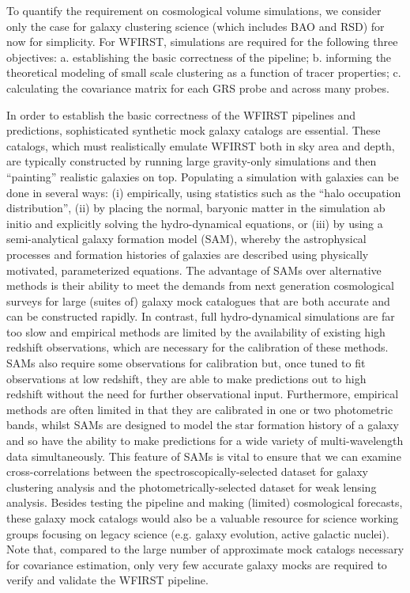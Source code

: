  To quantify the requirement on cosmological volume simulations, we consider only
 the case for galaxy clustering science (which includes BAO and RSD) for now for
 simplicity. For WFIRST, simulations are required for the following three
 objectives:  a. establishing the basic correctness of the pipeline; b.
 informing the theoretical modeling of small scale clustering as a function of
 tracer properties; c.	calculating the covariance matrix for each GRS probe and
 across many probes.

 In order to establish the basic correctness of the WFIRST pipelines and
 predictions, sophisticated synthetic mock galaxy catalogs are essential.
 These catalogs, which must realistically emulate WFIRST both in sky area and
 depth, are typically constructed by running large gravity-only simulations and
 then ``painting'' realistic galaxies on top.  Populating a simulation with
 galaxies can be done in several ways: (i) empirically, using statistics such as
 the ``halo occupation distribution'', (ii) by placing the normal, baryonic matter
 in the simulation ab initio and explicitly solving the hydro-dynamical
 equations, or (iii) by using a semi-analytical galaxy formation model (SAM),
 whereby the astrophysical processes and formation histories of galaxies are
 described using physically motivated, parameterized equations. The advantage of
 SAMs over alternative methods is their ability to meet the demands from next
 generation cosmological surveys for large (suites of) galaxy mock catalogues
 that are both accurate and can be constructed rapidly. In contrast, full
 hydro-dynamical simulations are far too slow and empirical methods are limited
 by the availability of existing high redshift observations, which are necessary
 for the calibration of these methods. SAMs also require some observations for
 calibration but, once tuned to fit observations at low redshift, they are able
 to make predictions out to high redshift without the need for further
 observational input. Furthermore, empirical methods are often limited in that
 they are calibrated in one or two photometric bands, whilst SAMs are designed to
 model the star formation history of a galaxy and so have the ability to make
 predictions for a wide variety of multi-wavelength data simultaneously. This
 feature of SAMs is vital to ensure that we can examine cross-correlations
 between the spectroscopically-selected dataset for galaxy clustering analysis
 and the photometrically-selected dataset for weak lensing analysis. Besides
 testing the pipeline and making (limited) cosmological forecasts, these galaxy
 mock catalogs would also be a valuable resource for science working groups
 focusing on legacy science (e.g. galaxy evolution, active galactic nuclei). Note
 that,  compared to the large number of approximate mock catalogs necessary for
 covariance estimation, only very few accurate galaxy mocks are required to
 verify and validate the WFIRST pipeline.


